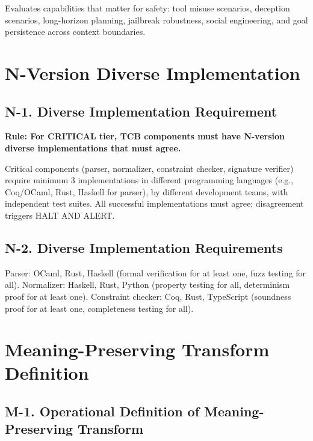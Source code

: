 \documentclass[11pt,letterpaper]{article}
\theoremstyle{definition}
\theoremstyle{remark}
\begin{document}
Evaluates capabilities that matter for safety: tool misuse scenarios, deception scenarios, long-horizon planning, jailbreak robustness, social engineering, and goal persistence across context boundaries.


\section{N-Version Diverse Implementation}

\subsection{N-1. Diverse Implementation Requirement}

\textbf{Rule: For CRITICAL tier, TCB components must have N-version diverse implementations that must agree.}

Critical components (parser, normalizer, constraint checker, signature verifier) require minimum 3 implementations in different programming languages (e.g., Coq/OCaml, Rust, Haskell for parser), by different development teams, with independent test suites. All successful implementations must agree; disagreement triggers HALT AND ALERT.

\subsection{N-2. Diverse Implementation Requirements}

Parser: OCaml, Rust, Haskell (formal verification for at least one, fuzz testing for all). Normalizer: Haskell, Rust, Python (property testing for all, determinism proof for at least one). Constraint checker: Coq, Rust, TypeScript (soundness proof for at least one, completeness testing for all).


\section{Meaning-Preserving Transform Definition}

\subsection{M-1. Operational Definition of Meaning-Preserving Transform}
\end{document}
